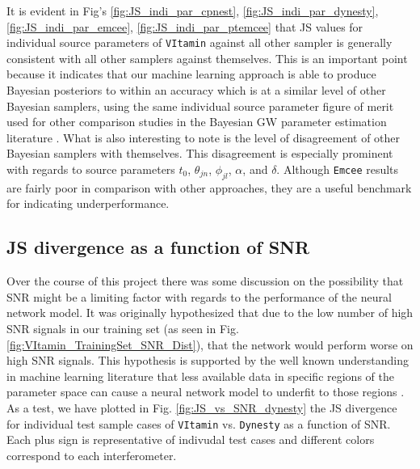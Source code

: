 It is evident in Fig's \ref{fig:JS_indi_par_cpnest}, 
\ref{fig:JS_indi_par_dynesty}, \ref{fig:JS_indi_par_emcee}, \ref{fig:JS_indi_par_ptemcee} that JS values for individual source 
parameters of \texttt{VItamin} against all other sampler is generally 
consistent with all other samplers against themselves. This is an important 
point because it indicates that our machine learning approach is able 
to produce Bayesian posteriors to within an accuracy which is at a similar 
level of other Bayesian samplers, using the same individual source 
parameter figure of merit used for other comparison studies in the Bayesian 
\ac{GW} parameter estimation literature \cite{1811.02042,2008.03312,PhysRevD.102.104057}. What is also 
interesting to note is the level of disagreement of other Bayesian samplers 
with themselves. This disagreement is especially prominent with regards 
to source parameters $t_0$, $\theta_{jn}$, $\phi_{jl}$, $\alpha$, and $\delta$.
Although \texttt{Emcee} results are fairly poor in comparison with other 
approaches, they are a useful benchmark for indicating underperformance. 


%
%

\subsection{JS divergence as a function of SNR}

Over the course of this project there was some discussion on the possibility 
that \ac{SNR} might be a limiting factor with regards to the performance 
of the neural network model. It was originally hypothesized that due to the 
low number of high \ac{SNR} signals in our training set (as seen in 
Fig. \ref{fig:VItamin_TrainingSet_SNR_Dist}), that the network would perform worse on high \ac{SNR} signals. 
This hypothesis is supported by the well known understanding in 
machine learning literature that less available 
data in specific regions of the parameter space can cause a neural network
model to underfit to those regions \cite{everitt2010cambridge}. As a test, 
we have plotted in Fig. \ref{fig:JS_vs_SNR_dynesty} the JS divergence for 
individual test sample cases of \texttt{VItamin} vs. \texttt{Dynesty} 
as a function of \ac{SNR}. Each plus sign is representative of indivudal test 
cases and different colors correspond to each interferometer. 

